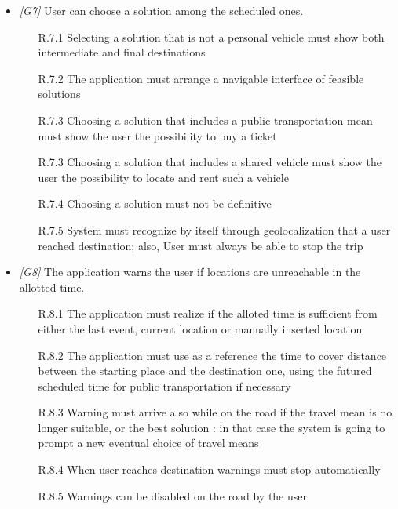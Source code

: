 \begin{itemize}
\begin{itemize}
                        
                  \end{itemize}
                  
\item \textit{[G7]} User can choose a solution among the scheduled ones. 

                   \begin{itemize}
                        \item [R.7.1] Selecting a solution that is not a personal vehicle must show both intermediate and final destinations
                        \item [R.7.2] The application must arrange a navigable interface of feasible solutions
                        \item [R.7.3] Choosing a solution that includes a public transportation mean must show the user the possibility to buy a ticket 
                        \item [R.7.3] Choosing a solution that includes a shared vehicle must show the user the possibility to locate and rent such a vehicle
                        \item [R.7.4] Choosing a solution must not be definitive
                        \item [R.7.5] System must recognize by itself through geolocalization that a user reached destination; also, User must always be able to stop the trip
                  \end{itemize}
                  
\item \textit{[G8]} The application warns the user if locations are unreachable in the allotted time.

                   \begin{itemize}
                        \item[R.8.1] The application must realize if the alloted time is sufficient from either the last event, current location or manually inserted location
                        \item[R.8.2] The application must use as a reference the time to cover distance between the starting place and the destination one, using the futured scheduled time for public transportation if necessary
                   	\item [R.8.3] Warning must arrive also while on the road if the travel mean is no longer suitable, or the best solution : in that case the system is going to prompt a new eventual choice of travel means
                   	\item [R.8.4] When user reaches destination warnings must stop automatically
                   	\item [R.8.5] Warnings can be disabled on the road by the user
                   \end{itemize}


\end{itemize}
